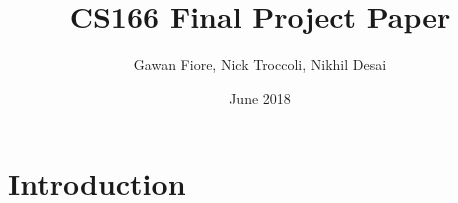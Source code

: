 \documentclass{article}
\title{CS166 Final Project Paper}
\author{Gawan Fiore, Nick Troccoli, Nikhil Desai}
\date{June 2018}
\begin{document}
\maketitle

\section{Introduction}
\end{document}
